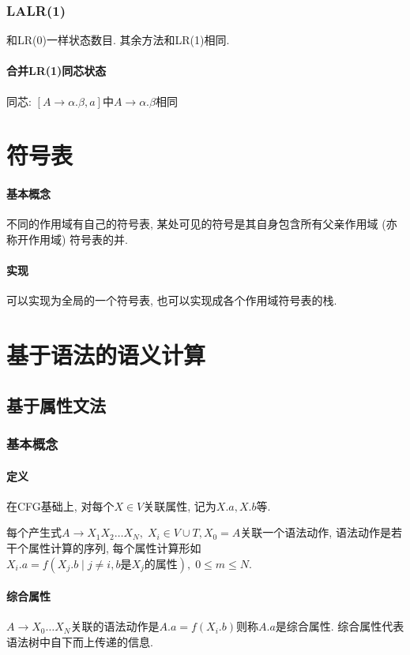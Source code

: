 \documentclass{ctexart}
\begin{document}
\subsubsection{LALR(1)}
    和LR(0)一样状态数目.
    其余方法和LR(1)相同.
\paragraph{合并LR(1)同芯状态} 同芯: $[A\to\alpha.\beta, a]$中$A\to\alpha.\beta$相同


\section{符号表}
\paragraph{基本概念}
    不同的作用域有自己的符号表, 某处可见的符号是其自身包含所有父亲作用域 (亦称开作用域) 符号表的并.
\paragraph{实现} 可以实现为全局的一个符号表, 也可以实现成各个作用域符号表的栈.

\section{基于语法的语义计算}
\subsection{基于属性文法}
\subsubsection{基本概念}
\paragraph{定义}
    在CFG基础上, 对每个$X \in V$关联属性, 记为$X.a, X.b$等.\par
    每个产生式$A\to X_1 X_2 \ldots X_N,\; X_i \in V \cup T, X_0 = A$关联一个语法动作,
    语法动作是若干个属性计算的序列, 每个属性计算形如$X_i.a = f(X_j.b \;|\; j \neq i, b\text{是}X_j\text{的属性}),\; 0 \le m \le N$.
\paragraph{综合属性} $A \to X_0 \ldots X_N$关联的语法动作是$A.a = f(X_i.b)$则称$A.a$是综合属性.
    综合属性代表语法树中自下而上传递的信息.
\end{document}
